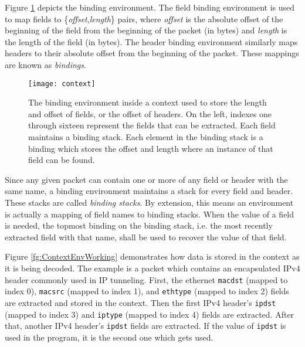 Figure \ref{fg:ContextEnv} depicts the binding environment. The field binding
environment is used to map fields to  \{\textit{offset},\textit{length}\} pairs, where \textit{offset} is the absolute offset of the beginning of the field from the beginning of the packet (in bytes) and \textit{length} is the length of the field (in bytes). The header binding environment similarly maps headers to their absolute offset from the beginning of the packet. These mappings are known as \textit{bindings}.

\begin{figure} \texttt{[image: context]}
\caption{The binding environment inside a context used to store the length and
offset of fields, or the offset of headers. On the left, indexes one through
sixteen represent the fields that can be extracted. Each field maintains a
binding stack. Each element in the binding stack is a binding which stores the
offset and length where an instance of that field can be found. }
\label{fg:ContextEnv} \end{figure}

Since any given packet can contain one or more of any field or header with the
same name, a binding environment maintains a stack for every field and header.
These stacks are called \textit{binding stacks}. By extension, this means an
environment is actually a mapping of field names to binding stacks. When the
value of a field is needed, the topmost binding on the binding stack, i.e. the most recently extracted field with that name, shall be
used to recover the value of that field.

Figure \ref{fg:ContextEnvWorking} demonstrates how data is stored in the context
as it is being decoded. The example is a packet which contains an encapsulated
IPv4 header commonly used in IP tunneling. First, the ethernet \texttt{macdst}
(mapped to index 0), \texttt{macsrc} (mapped to index 1), and \texttt{ethtype}
(mapped to index 2) fields are extracted and stored in the context. Then the
first IPv4 header's \texttt{ipdst} (mapped to index 3) and \texttt{iptype}
(mapped to index 4) fields are extracted. After that, another IPv4 header's
\texttt{ipdst} fields are extracted. If the value of
\texttt{ipdst} is used in the program, it is the second one which gets used.

